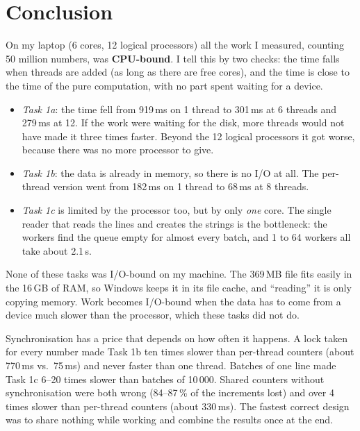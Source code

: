 \section{Conclusion}

On my laptop (6 cores, 12 logical processors) all the work I measured, counting 50 million
numbers, was \textbf{CPU-bound}. I tell this by two checks: the time falls when threads are added
(as long as there are free cores), and the time is close to the time of the pure computation, with
no part spent waiting for a device.
\begin{itemize}
\item \emph{Task 1a}: the time fell from 919\,ms on 1 thread to 301\,ms at 6 threads and 279\,ms at
12. If the work were waiting for the disk, more threads would not have made it three times faster.
Beyond the 12 logical processors it got worse, because there was no more processor to give.
\item \emph{Task 1b}: the data is already in memory, so there is no I/O at all. The per-thread
version went from 182\,ms on 1 thread to 68\,ms at 8 threads.
\item \emph{Task 1c} is limited by the processor too, but by only \emph{one} core. The single
reader that reads the lines and creates the strings is the bottleneck: the workers find the queue
empty for almost every batch, and 1 to 64 workers all take about 2.1\,s.
\end{itemize}
None of these tasks was I/O-bound on my machine. The 369\,MB file fits easily in the 16\,GB of RAM,
so Windows keeps it in its file cache, and ``reading'' it is only copying memory. Work becomes
I/O-bound when the data has to come from a device much slower than the processor, which these
tasks did not do.

Synchronisation has a price that depends on how often it happens. A lock taken for every number
made Task 1b ten times slower than per-thread counters (about 770\,ms vs.\ 75\,ms) and never faster
than one thread. Batches of one line made Task 1c 6--20 times slower than batches of 10\,000. Shared
counters without synchronisation were both wrong (84--87\,\% of the increments lost) and over
4 times slower than per-thread counters (about 330\,ms). The fastest correct design was to share
nothing while working and combine the results once at the end.

